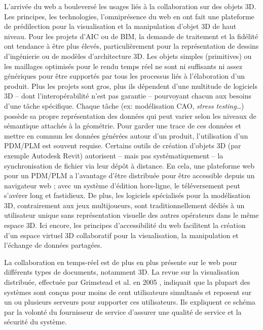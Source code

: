 L'arrivée du web a bouleversé les usages liés à la collaboration sur des objets 
\gls{3D}. 
Les principes, les technologies, l'omniprésence du web en ont fait une plateforme 
de prédilection pour la visualisation et la manipulation d'objet \gls{3D} de haut 
niveau.   
Pour les projets d'\gls{AIC} ou de \gls{BIM}, la demande de traitement et la fidélité 
ont tendance à être plus élevés, particulièrement pour la représentation de dessins 
d'ingénierie ou de modèles d'architecture \gls{3D}. 
Les objets simples (primitives) ou les maillages optimisés pour le rendu temps réel 
ne sont ni suffisants ni assez génériques pour être supportés par tous les 
processus liés à l'élaboration d'un produit. 
Plus les projets sont gros, plus ils dépendent d'une multitude de logiciels \gls{3D} 
--  
dont l'interopérabilité n'est pas garantie -- pourvoyant chacun aux besoins d'une 
tâche spécifique. 
Chaque tâche (ex: modélisation \gls{CAO}, \textit{stress testing}\ldots) possède sa 
propre représentation des données qui peut varier selon les niveaux de 
sémantique attachés à la géométrie. 
Pour garder une trace de ces données et mettre en commun les données 
générées autour d'un produit, l'utilisation d'un \gls{PDM}/\gls{PLM} est 
souvent requise. Certains outils de création d'objets \gls{3D} (par exemple 
Autodesk Revit) autorisent -- mais pas systématiquement -- la synchronisation de fichier via leur dépôt à distance. 
En cela, une plateforme web pour un \gls{PDM}/\gls{PLM} a 
l'avantage d'être distribuée pour être accessible depuis un navigateur web ; avec 
un système d'édition hors-ligne, le téléversement peut s'avérer long et fastidieux.
De plus, les logiciels spécialisés pour la modélisation \gls{3D}, contrairement aux 
jeux 
multijoueurs, sont traditionnellement dédiés à un utilisateur unique sans 
représentation visuelle des autres opérateurs dans le même espace \gls{3D}. 
Ici encore, les principes d'accessibilité du web facilitent la création d'un espace 
virtuel \gls{3D} collaboratif pour la visualisation, la manipulation et l'échange de
données partagées. 


La collaboration en temps-réel est de plus en plus présente sur le web pour 
différents types de documents, notamment \gls{3D}.
La revue sur la visualisation distribuée, effectuée par Grimstead et al. en 2005 
\cite{Grimstead2005}, indiquait que la plupart des systèmes sont conçus pour 
moins de cent 
utilisateurs simultanés et reposent sur un ou plusieurs serveurs pour supporter ces 
utilisateurs. 
Ils expliquent ce schéma par la volonté du fournisseur de service d'assurer une 
qualité de service et la sécurité du système. 

